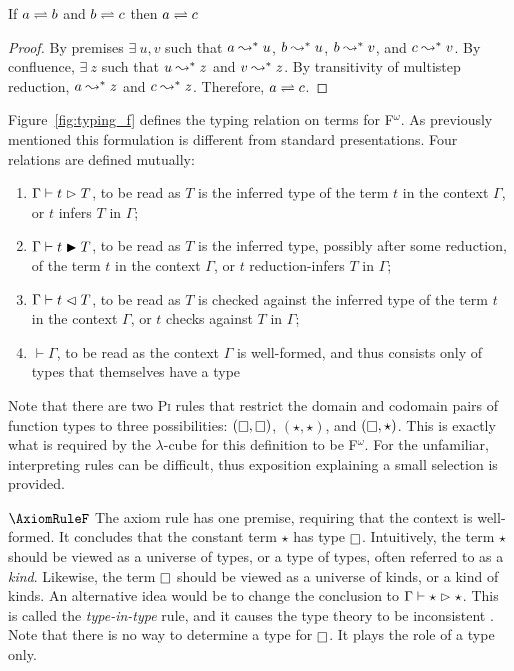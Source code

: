 \begin{theorem}
    \label{thm:1:trans}
    If $a \rightleftharpoons b$ and $b \rightleftharpoons c$ then $a \rightleftharpoons c$
\end{theorem}
\begin{proof}
    By premises $\exists\ u, v$ such that $a \leadsto^* u$, $b \leadsto^* u$, $b \leadsto^* v$, and $c \leadsto^* v$.
    By confluence, $\exists\ z$ such that $u \leadsto^* z$ and $v \leadsto^* z$.
    By transitivity of multistep reduction, $a \leadsto^* z$ and $c \leadsto^* z$.
    Therefore, $a \rightleftharpoons c$.
\end{proof}



Figure~\ref{fig:typing_f} defines the typing relation on terms for F$^\omega$.
As previously mentioned this formulation is different from standard presentations.
Four relations are defined mutually:
\begin{enumerate}
    \item $\Gamma \vdash t \vartriangleright T$, to be read as $T$ is the inferred type of the term $t$ in the context $\Gamma$, or $t$ infers $T$ in $\Gamma$;
    \item $\Gamma \vdash t \blacktriangleright T$, to be read as $T$ is the inferred type, possibly after some reduction, of the term $t$ in the context $\Gamma$, or $t$ reduction-infers $T$ in $\Gamma$;
    \item $\Gamma \vdash t \vartriangleleft T$, to be read as $T$ is checked against the inferred type of the term $t$ in the context $\Gamma$, or $t$ checks against $T$ in $\Gamma$;
    \item $\vdash \Gamma$, to be read as the context $\Gamma$ is well-formed, and thus consists only of types that themselves have a type
\end{enumerate}
Note that there are two \textsc{Pi} rules that restrict the domain and codomain pairs of function types to three possibilities: $(\kind, \kind)$, $(\star, \star)$, and $(\kind, \star)$.
This is exactly what is required by the $\lambda$-cube for this definition to be F$^\omega$.
For the unfamiliar, interpreting rules can be difficult, thus exposition explaining a small selection is provided.

$\AxiomRuleF$ The axiom rule has one premise, requiring that the context is well-formed.
It concludes that the constant term $\star$ has type $\kind$.
Intuitively, the term $\star$ should be viewed as a universe of types, or a type of types, often referred to as a \textit{kind}.
Likewise, the term $\kind$ should be viewed as a universe of kinds, or a kind of kinds.
An alternative idea would be to change the conclusion to $\Gamma \vdash \star \vartriangleright \star$.
This is called the \textit{type-in-type} rule, and it causes the type theory to be inconsistent \cite{girard1972,hurkens1995}.
Note that there is no way to determine a type for $\kind$.
It plays the role of a type only.

